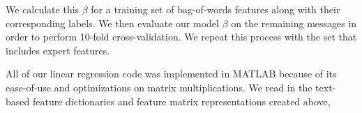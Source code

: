 \documentclass[preprint]{acm_proc_article-sp}
\begin{document}
We calculate this $\beta$ for a training set of bag-of-words features along with their corresponding labels. 
We then evaluate our model $\beta$ on the remaining messages in order to perform 10-fold cross-validation. 
We repeat this process with the set that includes expert features.

All of our linear regression code was implemented in MATLAB because of its ease-of-use 
and optimizations on matrix multiplications. We read in the text-based feature dictionaries and feature matrix
representations created above, 


%
%
%
\end{document}
